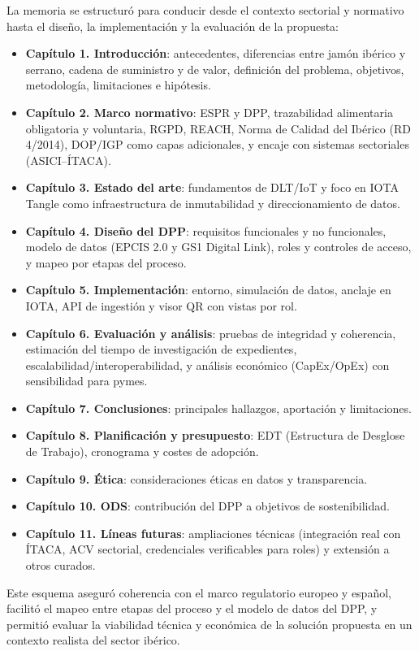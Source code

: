 La memoria se estructuró para conducir desde el contexto sectorial y normativo hasta el diseño, la implementación y la evaluación de la propuesta:
\begin{itemize}
    \item \textbf{Capítulo 1. Introducción}: antecedentes, diferencias entre jamón ibérico y serrano, cadena de suministro y de valor, definición del problema, objetivos, metodología, limitaciones e hipótesis.
    \item \textbf{Capítulo 2. Marco normativo}: ESPR y DPP, trazabilidad alimentaria obligatoria y voluntaria, RGPD, REACH, Norma de Calidad del Ibérico (RD 4/2014), DOP/IGP como capas adicionales, y encaje con sistemas sectoriales (ASICI–ÍTACA).
    \item \textbf{Capítulo 3. Estado del arte}: fundamentos de DLT/IoT y foco en IOTA Tangle como infraestructura de inmutabilidad y direccionamiento de datos.
    \item \textbf{Capítulo 4. Diseño del DPP}: requisitos funcionales y no funcionales, modelo de datos (EPCIS 2.0 y GS1 Digital Link), roles y controles de acceso, y mapeo por etapas del proceso.
    \item \textbf{Capítulo 5. Implementación}: entorno, simulación de datos, anclaje en IOTA, API de ingestión y visor QR con vistas por rol.
    \item \textbf{Capítulo 6. Evaluación y análisis}: pruebas de integridad y coherencia, estimación del tiempo de investigación de expedientes, escalabilidad/interoperabilidad, y análisis económico (CapEx/OpEx) con sensibilidad para pymes.
    \item \textbf{Capítulo 7. Conclusiones}: principales hallazgos, aportación y limitaciones.
    \item \textbf{Capítulo 8. Planificación y presupuesto}: EDT (Estructura de Desglose de Trabajo), cronograma y costes de adopción.
    \item \textbf{Capítulo 9. Ética}: consideraciones éticas en datos y transparencia.
    \item \textbf{Capítulo 10. ODS}: contribución del DPP a objetivos de sostenibilidad.
    \item \textbf{Capítulo 11. Líneas futuras}: ampliaciones técnicas (integración real con ÍTACA, ACV sectorial, credenciales verificables para roles) y extensión a otros curados.
\end{itemize}

Este esquema aseguró coherencia con el marco regulatorio europeo y español, facilitó el mapeo entre etapas del proceso y el modelo de datos del DPP, y permitió evaluar la viabilidad técnica y económica de la solución propuesta en un contexto realista del sector ibérico.